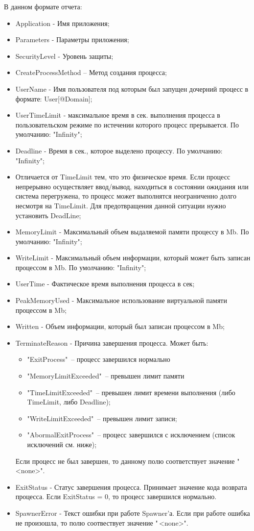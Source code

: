 \documentclass{imcs}
\begin{document}
В данном формате отчета:
\begin{itemize}
  \item Application - Имя приложения;
  \item Parameters - Параметры приложения;
  \item SecurityLevel - Уровень защиты;
  \item CreateProcessMethod – Метод создания процесса;
  \item UserName - Имя пользователя под которым был запущен дочерний процесс в формате: User[@Domain];
  \item UserTimeLimit - максимальное время в сек. выполнения процесса в пользовательском режиме по истечении  которого процесс прерывается. По умолчанию: "Infinity";
  \item Deadline - Время в сек., которое выделено процессу. По умолчанию: "Infinity";
  \item Отличается от TimeLimit тем, что это физическое время. Если процесс непрерывно осуществляет ввод/вывод, находиться в состоянии ожидания или система перегружена,  то процесс может выполнятся неограниченно долго несмотря на TimeLimit. Для предотвращения данной ситуации нужно установить DeadLine;
  \item MemoryLimit - Максимальный объем выдаляемой памяти процессу в Mb. По умолчанию: "Infinity";
  \item WriteLimit - Максимальный объем информации, который может быть записан процессом в Mb. По умолчанию: "Infinity";
  \item UserTime - Фактическое время выполнения процесса в сек;
  \item PeakMemoryUsed - Максимальное использование виртуальной памяти процессом в Mb;
  \item Written - Объем информации, который был записан процессом в Mb;
  \item TerminateReason - Причина завершения процесса. Может быть:  
  \begin{itemize}       
    \item "ExitProcess"\, -- процесс завершился нормально
    \item "MemoryLimitExceeded"\, -- превышен лимит памяти
    \item "TimeLimitExceeded"\, -- превышен лимит времени выполнения (либо TimeLimit, либо Deadline);
    \item "WriteLimitExceeded"\, -- превышен лимит записи;
    \item "AbormalExitProcess"\, -- процесс завершился с исключением (список исключений см. ниже);
  \end{itemize}
  Если процесс не был завершен, то данному полю соответствует значение "\,<none>".                
  \item ExitStatus - Статус завершения процесса. Принимает значение кода возврата процесса. Если ExitStatus = 0, то процесс завершился нормально.
  \item SpawnerError - Текст ошибки при работе Spawner'а. Если при работе ошибка не произошла, то полю соотвествует значение "\,<none>".
\end{itemize}
\end{document}
